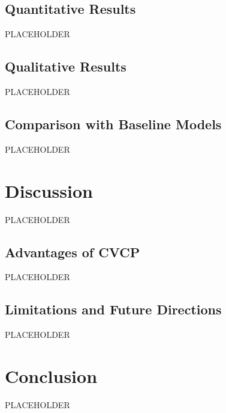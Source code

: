 \documentclass[twocolumn, times]{article}
\begin{document}
\subsection{Quantitative Results}
PLACEHOLDER

\subsection{Qualitative Results}
PLACEHOLDER

\subsection{Comparison with Baseline Models}
PLACEHOLDER

\section{Discussion}
PLACEHOLDER

\subsection{Advantages of CVCP}
PLACEHOLDER

\subsection{Limitations and Future Directions}
PLACEHOLDER

\section{Conclusion}
PLACEHOLDER

% 
% 
\end{document}
